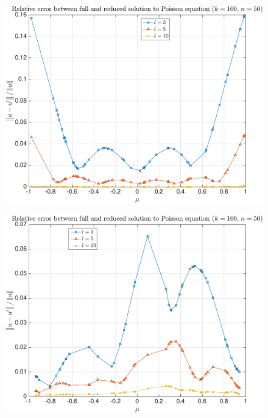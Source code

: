 \documentclass[11pt,a4paper]{article}
\theoremstyle{definition}
\theoremstyle{theorem}
\begin{document}
	\begin{figure}
		\center
		\includegraphics[scale=0.5]{fig5}
		\caption{}
	\end{figure}
	
	\begin{figure}
		\center
		\includegraphics[scale=0.5]{fig6}
		\caption{}
	\end{figure}
	
\end{document}
